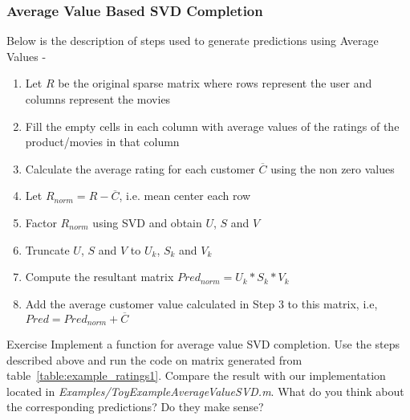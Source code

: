   \subsubsection{Average Value Based SVD Completion} 
  Below is the description of steps used to generate predictions using Average Values -
  \begin{enumerate}
    \item Let $R$ be the original sparse matrix where rows represent the user and columns represent the movies
    \item Fill the empty cells in each column with average values of the ratings of the product/movies in that column
    \item Calculate the average rating for each customer $\overline{C}$ using the non zero values
    \item Let $R_{norm} = R - \overline{C}$, i.e. mean center each row 
    \item Factor $R_{norm}$ using SVD and obtain $U$, $S$ and $V$
    \item Truncate $U$, $S$ and $V$ to $U_k$, $S_k$ and $V_k$
    \item Compute the resultant matrix $Pred_{norm} = U_k*S_k*V_k$
    \item Add the average customer value calculated in Step 3 to this matrix, i.e, $Pred = Pred_{norm} + \overline{C} $
  \end{enumerate}
\begin{myremark}{Exercise }
Implement a function for average value SVD completion. Use the steps described above and run the code on matrix generated from table~\ref{table:example_ratings1}. Compare the result with our implementation located in \textit{Examples/ToyExampleAverageValueSVD.m}. What do you think about the corresponding predictions? Do they make sense? 
\end{myremark}

